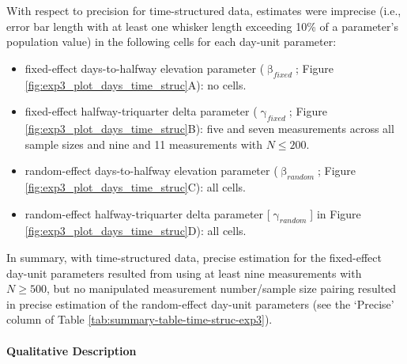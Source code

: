 \documentclass[
12pt, %
twoside,
english]{guelphthesis}
\begin{document}
With respect to precision for time-structured data, estimates were imprecise (i.e., error bar length with at least one whisker length exceeding 10\% of a parameter's population value) in the following cells for each day-unit parameter:
\begin{itemize}
\tightlist
\item
  fixed-effect days-to-halfway elevation parameter (\(\upbeta_{fixed}\); Figure \ref{fig:exp3_plot_days_time_struc}A): no cells.
\item
  fixed-effect halfway-triquarter delta parameter (\(\upgamma_{fixed}\); Figure \ref{fig:exp3_plot_days_time_struc}B): five and seven measurements across all sample sizes and nine and 11 measurements with \(N \le 200\).
\item
  random-effect days-to-halfway elevation parameter (\(\upbeta_{random}\); Figure \ref{fig:exp3_plot_days_time_struc}C): all cells.
\item
  random-effect halfway-triquarter delta parameter {[}\(\upgamma_{random}\){]} in Figure \ref{fig:exp3_plot_days_time_struc}D): all cells.
\end{itemize}
In summary, with time-structured data, precise estimation for the fixed-effect day-unit parameters resulted from using at least nine measurements with \(N \ge 500\), but no manipulated measurement number/sample size pairing resulted in precise estimation of the random-effect day-unit parameters (see the `Precise' column of Table \ref{tab:summary-table-time-struc-exp3}).

\hypertarget{qualitative-time-struc-exp3}{%
\paragraph{Qualitative Description}\label{qualitative-time-struc-exp3}}
\end{document}
